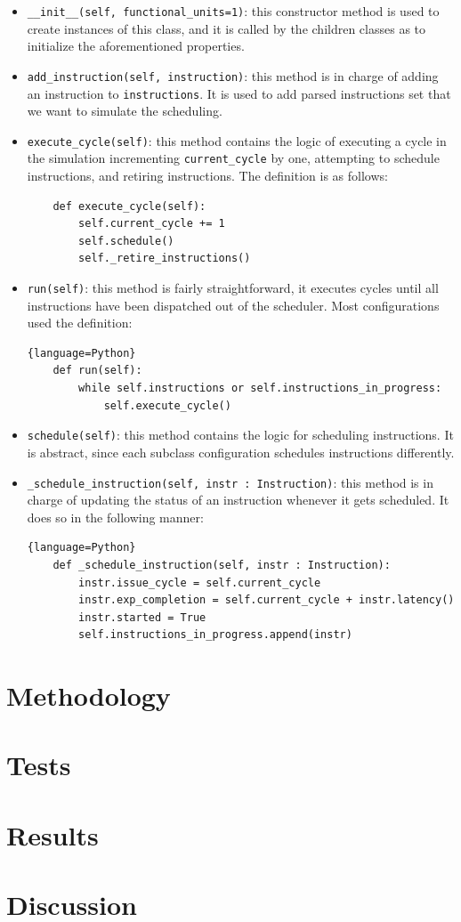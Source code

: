 \documentclass{article}
\begin{document}
\begin{itemize}
    \item \lstinline|__init__(self, functional_units=1)|: this constructor method is used to create instances of this class, and it is called by the children classes as to initialize the aforementioned properties. 
    
    \item \lstinline|add_instruction(self, instruction)|: this method is in charge of adding an instruction to \lstinline|instructions|. It is used to add parsed instructions set that we want to simulate the scheduling.
    
    \item \lstinline|execute_cycle(self)|: this method contains the logic of executing a cycle in the simulation incrementing \lstinline|current_cycle| by one, attempting to schedule instructions, and retiring instructions. The definition is as follows:
    \begin{lstlisting}
    def execute_cycle(self):
        self.current_cycle += 1
        self.schedule()
        self._retire_instructions()
    \end{lstlisting}
    
    \item \lstinline|run(self)|: this method is fairly straightforward, it executes cycles until all instructions have been dispatched out of the scheduler. Most configurations used the definition:
    \begin{lstlisting}{language=Python}
    def run(self):
        while self.instructions or self.instructions_in_progress:
            self.execute_cycle()
    \end{lstlisting}

    \item \lstinline|schedule(self)|: this method contains the logic for scheduling instructions. It is abstract, since each subclass configuration schedules instructions differently. 
    
    \item \lstinline|_schedule_instruction(self, instr : Instruction)|: this method is in charge of updating the status of an instruction whenever it gets scheduled. It does so in the following manner:
    \begin{lstlisting}{language=Python}
    def _schedule_instruction(self, instr : Instruction):
        instr.issue_cycle = self.current_cycle
        instr.exp_completion = self.current_cycle + instr.latency()
        instr.started = True 
        self.instructions_in_progress.append(instr)
    \end{lstlisting}
\end{itemize}


\section{Methodology}

\section{Tests}

\section{Results}

\section{Discussion}
\end{document}
